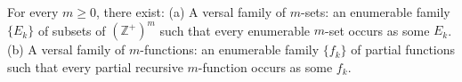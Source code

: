 For every $m \geqslant 0$, there exist:
(a) A versal family of $m$-sets: an enumerable family $\{E_k\}$ of subsets of $(\mathbb{Z}^+)^m$ such that every enumerable $m$-set occurs as some $E_k$.
(b) A versal family of $m$-functions: an enumerable family $\{f_k\}$ of partial functions such that every partial recursive $m$-function occurs as some $f_k$.